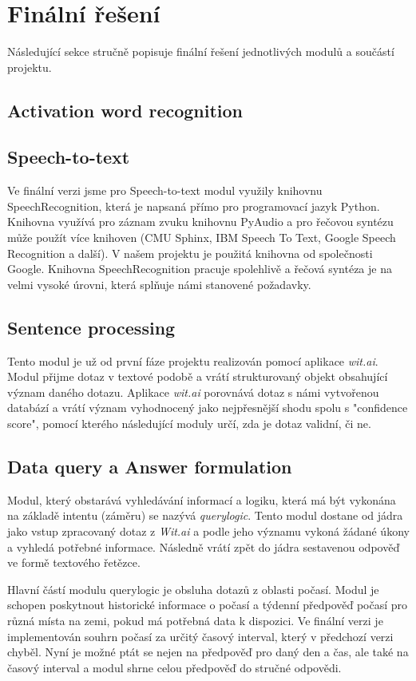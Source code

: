 \documentclass[12pt,a4paper]{article}
\begin{document}
\section{Finální řešení}
Následující sekce stručně popisuje finální řešení jednotlivých modulů a součástí projektu.


\subsection{Activation word recognition}

\subsection{Speech-to-text}
Ve finální verzi jsme pro Speech-to-text modul využily knihovnu SpeechRecognition, která je napsaná přímo pro programovací jazyk Python. Knihovna využívá pro záznam zvuku knihovnu PyAudio a pro řečovou syntézu může použít více knihoven (CMU Sphinx, IBM Speech To Text, Google Speech Recognition a další). V našem projektu je použitá knihovna od společnosti Google. Knihovna SpeechRecognition pracuje spolehlivě a řečová syntéza je na velmi vysoké úrovni, která splňuje námi stanovené požadavky.

\subsection{Sentence processing}
Tento modul je už od první fáze projektu realizován pomocí aplikace \textit{wit.ai}. Modul přijme dotaz v textové podobě a vrátí strukturovaný objekt obsahující význam daného dotazu. Aplikace \textit{wit.ai} porovnává dotaz s námi vytvořenou databází a vrátí význam vyhodnocený jako nejpřesnější shodu spolu s "confidence score", pomocí kterého následující moduly určí, zda je dotaz validní, či ne.

\subsection{Data query a Answer formulation}
Modul, který obstarává vyhledávání informací a logiku, která má být vykonána na základě intentu (záměru) se nazývá \textit{querylogic}. Tento modul dostane od jádra jako vstup zpracovaný dotaz z \textit{Wit.ai} a podle jeho významu vykoná žádané úkony a vyhledá potřebné informace. Následně vrátí zpět do jádra sestavenou odpověď ve formě textového řetězce.

Hlavní částí modulu querylogic je obsluha dotazů z oblasti počasí.  Modul je schopen poskytnout historické informace o počasí a týdenní předpověď počasí pro různá místa na zemi, pokud má potřebná data k dispozici. Ve finální verzi je implementován souhrn počasí za určitý časový interval, který v předchozí verzi chyběl. Nyní je možné ptát se nejen na předpověď pro daný den a čas, ale také na časový interval a modul shrne celou předpověď do stručné odpovědi.
\end{document}
